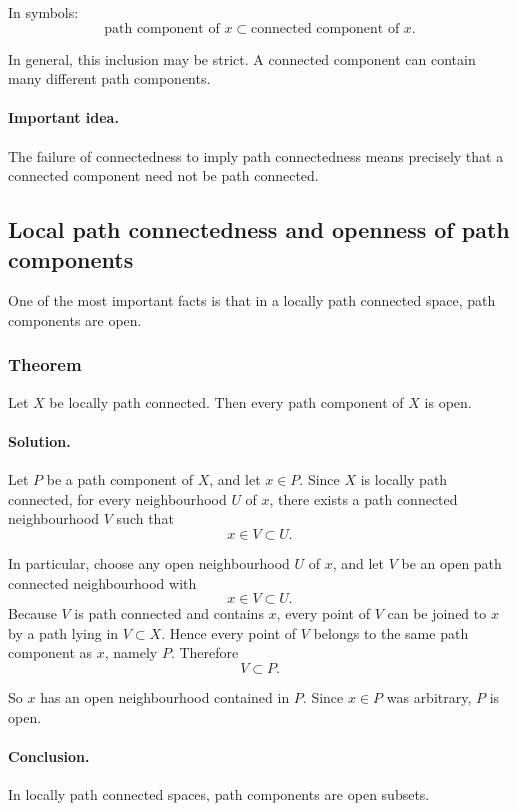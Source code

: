 \documentclass[12pt,a4paper]{article}
\theoremstyle{notespace}
\begin{document}
In symbols:
\[
\text{path component of }x
\subset
\text{connected component of }x.
\]

In general, this inclusion may be strict. A connected component can contain many different path components.

\paragraph{Important idea.}
The failure of connectedness to imply path connectedness means precisely that a connected component need not be path connected.

\subsection{Local path connectedness and openness of path components}

One of the most important facts is that in a locally path connected space, path components are open.

\subsubsection{Theorem}

Let \(X\) be locally path connected. Then every path component of \(X\) is open.

\paragraph{\textbf{Solution.}}
Let \(P\) be a path component of \(X\), and let \(x\in P\). Since \(X\) is locally path connected, for every neighbourhood \(U\) of \(x\), there exists a path connected neighbourhood \(V\) such that
\[
x\in V\subset U.
\]

In particular, choose any open neighbourhood \(U\) of \(x\), and let \(V\) be an open path connected neighbourhood with
\[
x\in V\subset U.
\]
Because \(V\) is path connected and contains \(x\), every point of \(V\) can be joined to \(x\) by a path lying in \(V\subset X\). Hence every point of \(V\) belongs to the same path component as \(x\), namely \(P\). Therefore
\[
V\subset P.
\]

So \(x\) has an open neighbourhood contained in \(P\). Since \(x\in P\) was arbitrary, \(P\) is open.

\paragraph{Conclusion.}
In locally path connected spaces, path components are open subsets.
\end{document}
